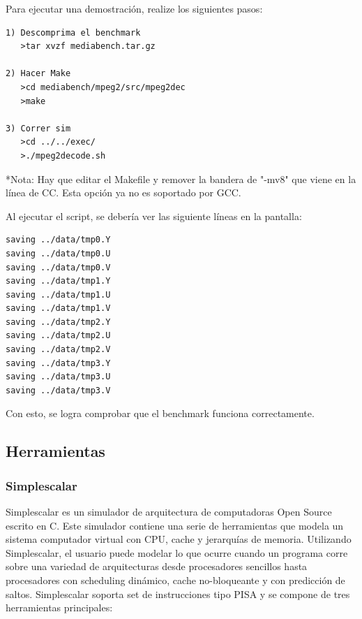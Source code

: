 \documentclass[journal]{IEEEtran}
\begin{document}
Para ejecutar una demostración, realize los siguientes pasos: \newline

\footnotesize \begin{verbatim}
1) Descomprima el benchmark
   >tar xvzf mediabench.tar.gz

2) Hacer Make 
   >cd mediabench/mpeg2/src/mpeg2dec
   >make

3) Correr sim
   >cd ../../exec/
   >./mpeg2decode.sh

\end{verbatim}
\normalsize

\footnotesize
*Nota: Hay que editar el Makefile y remover la bandera de "-mv8" que viene en la l\'{i}nea de CC. Esta opci\'on ya no es soportado por GCC. \newline
\normalsize

Al ejecutar el script, se deber\'{i}a ver las siguiente l\'{i}neas en la pantalla:

\footnotesize \begin{verbatim}
saving ../data/tmp0.Y
saving ../data/tmp0.U
saving ../data/tmp0.V
saving ../data/tmp1.Y
saving ../data/tmp1.U
saving ../data/tmp1.V
saving ../data/tmp2.Y
saving ../data/tmp2.U
saving ../data/tmp2.V
saving ../data/tmp3.Y
saving ../data/tmp3.U
saving ../data/tmp3.V
\end{verbatim}
\normalsize

Con esto, se logra comprobar que el benchmark funciona correctamente.

\subsection{Herramientas}

\subsubsection{Simplescalar}
Simplescalar\cite{SIMPLESCALAR} es un simulador de arquitectura de computadoras Open Source escrito en C. Este simulador contiene una serie de herramientas que modela un sistema computador virtual con CPU, cache y jerarqu\'{i}as de memoria.
Utilizando Simplescalar, el usuario puede modelar lo que ocurre cuando un programa corre sobre una variedad de arquitecturas desde procesadores sencillos hasta procesadores con scheduling din\'{a}mico, cache no-bloqueante
y con predicci\'{o}n de saltos. Simplescalar soporta set de instrucciones tipo PISA y se compone de tres herramientas principales: \newline
\end{document}
